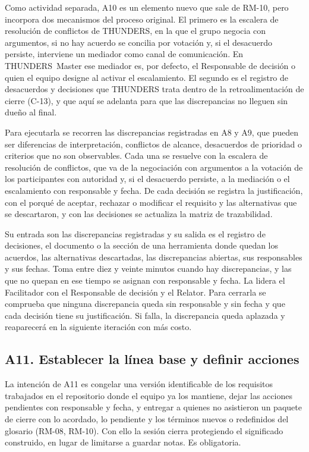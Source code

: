\documentclass[12pt,letterpaper,oneside]{report}
\begin{document}
Como actividad separada, A10 es un elemento nuevo que sale de RM-10, pero
incorpora dos mecanismos del proceso original. El primero es la escalera de
resolución de conflictos de THUNDERS, en la que el grupo negocia con argumentos,
si no hay acuerdo se concilia por votación y, si el desacuerdo persiste,
interviene un mediador como canal de comunicación. En THUNDERS~Master ese
mediador es, por defecto, el Responsable de decisión o quien el equipo designe al
activar el escalamiento. El segundo es el registro de desacuerdos y decisiones
que THUNDERS trata dentro de la retroalimentación de cierre (C-13), y que aquí
se adelanta para que las discrepancias no lleguen sin dueño al final.

Para ejecutarla se recorren las discrepancias registradas en A8 y A9, que pueden
ser diferencias de interpretación, conflictos de alcance, desacuerdos de
prioridad o criterios que no son observables. Cada una se resuelve con la
escalera de resolución de conflictos, que va de la negociación con argumentos a la votación de los
participantes con autoridad y, si el desacuerdo persiste, a la mediación o el
escalamiento con responsable y fecha. De cada decisión se registra la
justificación, con el porqué de aceptar, rechazar o modificar el requisito y
las alternativas que se descartaron, y con las decisiones se actualiza la matriz
de trazabilidad.

Su entrada son las discrepancias registradas y su salida es el registro de
decisiones, el documento o la sección de una herramienta donde quedan los
acuerdos, las alternativas descartadas, las discrepancias abiertas, sus
responsables y sus fechas. Toma entre diez y veinte minutos cuando hay
discrepancias, y las que no quepan en ese tiempo se asignan con responsable y
fecha. La lidera el Facilitador con el Responsable de decisión y el Relator. Para
cerrarla se comprueba que ninguna discrepancia queda sin responsable y sin fecha
y que cada decisión tiene su justificación. Si falla, la discrepancia queda
aplazada y reaparecerá en la siguiente iteración con más costo.

\subsection{A11. Establecer la línea base y definir acciones}
La intención de A11 es congelar una versión identificable de los requisitos
trabajados en el repositorio donde el equipo ya los mantiene, dejar las acciones
pendientes con responsable y fecha, y entregar a quienes no asistieron un
paquete de cierre con lo acordado, lo pendiente y los términos nuevos o
redefinidos del glosario (RM-08, RM-10). Con ello la sesión cierra protegiendo
el significado construido, en lugar de limitarse a guardar notas. Es
obligatoria.
\end{document}
